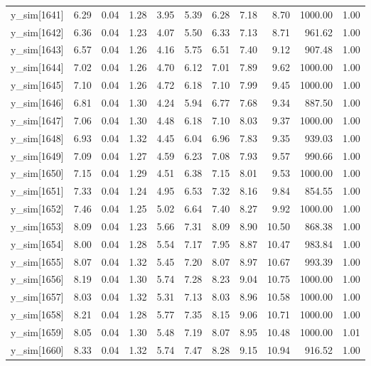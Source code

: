 \begin{table}[ht]
\begin{tabular}{rrrrrrrrrrr}
  y\_sim[1641] & 6.29 & 0.04 & 1.28 & 3.95 & 5.39 & 6.28 & 7.18 & 8.70 & 1000.00 & 1.00 \\ 
  y\_sim[1642] & 6.36 & 0.04 & 1.23 & 4.07 & 5.50 & 6.33 & 7.13 & 8.71 & 961.62 & 1.00 \\ 
  y\_sim[1643] & 6.57 & 0.04 & 1.26 & 4.16 & 5.75 & 6.51 & 7.40 & 9.12 & 907.48 & 1.00 \\ 
  y\_sim[1644] & 7.02 & 0.04 & 1.26 & 4.70 & 6.12 & 7.01 & 7.89 & 9.62 & 1000.00 & 1.00 \\ 
  y\_sim[1645] & 7.10 & 0.04 & 1.26 & 4.72 & 6.18 & 7.10 & 7.99 & 9.45 & 1000.00 & 1.00 \\ 
  y\_sim[1646] & 6.81 & 0.04 & 1.30 & 4.24 & 5.94 & 6.77 & 7.68 & 9.34 & 887.50 & 1.00 \\ 
  y\_sim[1647] & 7.06 & 0.04 & 1.30 & 4.48 & 6.18 & 7.10 & 8.03 & 9.37 & 1000.00 & 1.00 \\ 
  y\_sim[1648] & 6.93 & 0.04 & 1.32 & 4.45 & 6.04 & 6.96 & 7.83 & 9.35 & 939.03 & 1.00 \\ 
  y\_sim[1649] & 7.09 & 0.04 & 1.27 & 4.59 & 6.23 & 7.08 & 7.93 & 9.57 & 990.66 & 1.00 \\ 
  y\_sim[1650] & 7.15 & 0.04 & 1.29 & 4.51 & 6.38 & 7.15 & 8.01 & 9.53 & 1000.00 & 1.00 \\ 
  y\_sim[1651] & 7.33 & 0.04 & 1.24 & 4.95 & 6.53 & 7.32 & 8.16 & 9.84 & 854.55 & 1.00 \\ 
  y\_sim[1652] & 7.46 & 0.04 & 1.25 & 5.02 & 6.64 & 7.40 & 8.27 & 9.92 & 1000.00 & 1.00 \\ 
  y\_sim[1653] & 8.09 & 0.04 & 1.23 & 5.66 & 7.31 & 8.09 & 8.90 & 10.50 & 868.38 & 1.00 \\ 
  y\_sim[1654] & 8.00 & 0.04 & 1.28 & 5.54 & 7.17 & 7.95 & 8.87 & 10.47 & 983.84 & 1.00 \\ 
  y\_sim[1655] & 8.07 & 0.04 & 1.32 & 5.45 & 7.20 & 8.07 & 8.97 & 10.67 & 993.39 & 1.00 \\ 
  y\_sim[1656] & 8.19 & 0.04 & 1.30 & 5.74 & 7.28 & 8.23 & 9.04 & 10.75 & 1000.00 & 1.00 \\ 
  y\_sim[1657] & 8.03 & 0.04 & 1.32 & 5.31 & 7.13 & 8.03 & 8.96 & 10.58 & 1000.00 & 1.00 \\ 
  y\_sim[1658] & 8.21 & 0.04 & 1.28 & 5.77 & 7.35 & 8.15 & 9.06 & 10.71 & 1000.00 & 1.00 \\ 
  y\_sim[1659] & 8.05 & 0.04 & 1.30 & 5.48 & 7.19 & 8.07 & 8.95 & 10.48 & 1000.00 & 1.01 \\ 
  y\_sim[1660] & 8.33 & 0.04 & 1.32 & 5.74 & 7.47 & 8.28 & 9.15 & 10.94 & 916.52 & 1.00 \\ 

\end{tabular}
\end{table}
